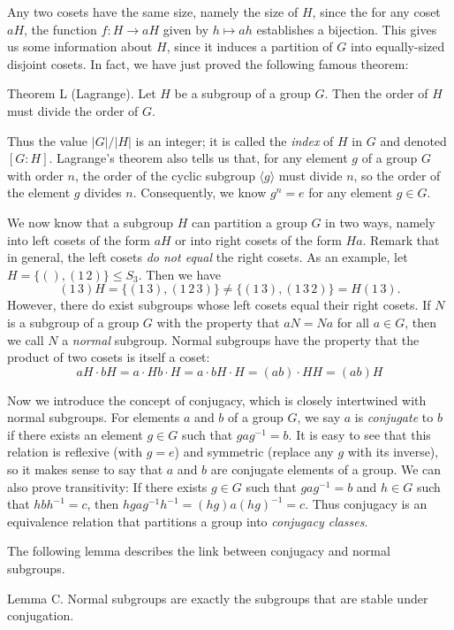 Any two cosets have the same size, namely the size of $H$, since the for any coset $aH$, the function $f:H\rightarrow aH$ given by $h\mapsto ah$ establishes a bijection. This gives us some information about $H$, since it induces a partition of $G$ into equally-sized disjoint cosets. In fact, we have just proved the following famous theorem:

\parenproclaim Theorem L (Lagrange). Let $H$ be a subgroup of a group $G$. Then the order of $H$ must divide the order of $G$.\slug

Thus the value $|G|/|H|$ is an integer; it is called the {\it index} of $H$ in $G$ and denoted $[G:H]$. Lagrange's theorem also tells us that, for any element $g$ of a group $G$ with order $n$, the order of the cyclic subgroup $\langle g\rangle$ must divide $n$, so the order of the element $g$ divides $n$. Consequently, we know $g^n=e$ for any element $g\in G$.

We now know that a subgroup $H$ can partition a group $G$ in two ways, namely into left cosets of the form $aH$ or into right cosets of the form $Ha$. Remark that in general, the left cosets {\it do not equal} the right cosets. As an example, let $H = \{(), (1\,2)\} \leq S_3$. Then we have
$$(1\,3)H = \{(1\,3), (1\,2\,3)\} \neq \{(1\,3),(1\,3\,2)\} = H(1\,3).$$
However, there do exist subgroups whose left cosets equal their right cosets. If $N$ is a subgroup of a group $G$ with the property that $aN = Na$ for all $a\in G$, then we call $N$ a {\it normal} subgroup. Normal subgroups have the property that the product of two cosets is itself a coset:
$$aH\cdot bH = a\cdot Hb\cdot H = a \cdot bH \cdot H = (ab)\cdot HH = (ab)H$$

Now we introduce the concept of conjugacy, which is closely intertwined with normal subgroups. For elements $a$ and $b$ of a group $G$, we say $a$ is {\it conjugate} to $b$ if there exists an element $g\in G$ such that $gag^{-1} = b$. It is easy to see that this relation is reflexive (with $g=e$) and symmetric (replace any $g$ with its inverse), so it makes sense to say that $a$ and $b$ are conjugate elements of a group. We can also prove transitivity: If there exists $g\in G$ such that $gag^{-1} = b$ and $h\in G$ such that $hbh^{-1} = c$, then $hgag^{-1}h^{-1}= (hg)a(hg)^{-1} = c$. Thus conjugacy is an equivalence relation that partitions a group into {\it conjugacy classes}.

The following lemma describes the link between conjugacy and normal subgroups.

\proclaim Lemma C. Normal subgroups are exactly the subgroups that are stable under conjugation.

